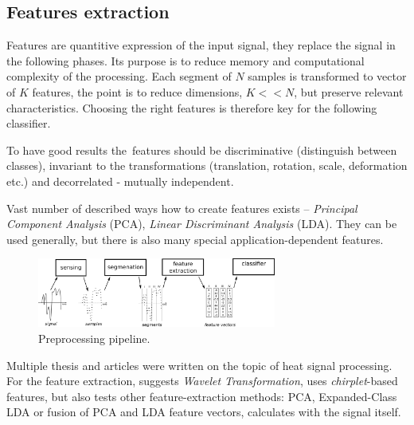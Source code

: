 \subsection*{Features extraction}
Features are quantitive expression of the input signal, they replace the signal in the following phases.
Its purpose is to reduce memory and computational complexity of the processing. Each segment of $N$ samples
is transformed to vector of $K$ features, the point is to reduce dimensions, $K << N$, but preserve
relevant characteristics. Choosing the right features is therefore key for the following classifier.

To have good results the~features should be discriminative (distinguish between classes), invariant to
the transformations (translation, rotation, scale, deformation etc.) and decorrelated - mutually independent.

Vast number of described ways how to create features exists -- {\it Principal Component Analysis} (PCA),
{\it Linear Discriminant Analysis} (LDA). They can be used generally, but there is also many special
application-dependent features. 

\begin{figure}[h!]
\begin{center}
\includegraphics[width=0.7\textwidth]{obrazky-figures/featureextraction.png}
\caption{Preprocessing pipeline.\label{fig:featureextraction}}
\end{center}
\end{figure}

Multiple thesis and articles were written on the topic of heat signal processing. For the feature extraction,
\cite{SinglePIR} suggests {\it Wavelet Transformation}, \cite{ChirpletSVM} uses {\it chirplet}-based features,
but also tests other feature-extraction methods: PCA, Expanded-Class LDA or fusion of PCA and LDA feature vectors,
\cite{BayesanClassifier} calculates with the signal itself.

